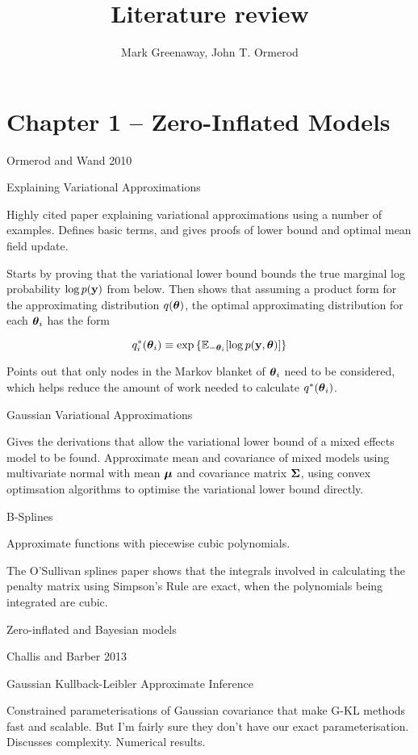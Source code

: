 \documentclass{amsart}[12pt]
\title{Literature review}
\author{Mark Greenaway, John T. Ormerod}
\begin{document}
\maketitle

\section{Chapter 1 -- Zero-Inflated Models}

Ormerod and Wand 2010

Explaining Variational Approximations

Highly cited paper explaining variational approximations using a number of examples.
Defines basic terms, and gives proofs of lower bound and optimal mean field update.

Starts by proving that the variational lower bound  bounds the true marginal log probability $\log p({\bf y})$
from below. Then shows that assuming a product form for the approximating distribution $q({\boldsymbol \theta})$, the
optimal approximating distribution for each ${\boldsymbol \theta}_i$ has the form

\[
	q_i^*({\boldsymbol \theta}_i) \equiv \exp{\{\mathbb{E}_{-{\boldsymbol\theta}_i}[\log p({\bf y}, {\boldsymbol\theta})]\}}
\]

Points out that only nodes in the Markov blanket of ${\boldsymbol \theta}_i$ need to be considered, which helps reduce the
amount of work needed to calculate $q^*({\boldsymbol \theta}_i)$.

Gaussian Variational Approximations

Gives the derivations that allow the variational lower bound of a mixed effects model to be found. Approximate
mean and covariance of mixed models using multivariate normal with mean ${\boldsymbol \mu}$ and covariance matrix
${\boldsymbol \Sigma}$, using convex optimsation algorithms to optimise the variational lower bound directly.

B-Splines

Approximate functions with piecewise cubic polynomials.

The O'Sullivan splines paper shows that the integrals involved in calculating the penalty matrix using Simpson's Rule are exact, when the polynomials being integrated are cubic.

Zero-inflated and Bayesian models

Challis and Barber 2013

Gaussian Kullback-Leibler Approximate Inference

Constrained parameterisations of Gaussian covariance that make G-KL methods fast and scalable. But I'm fairly
sure they don't have our exact parameterisation. Discusses complexity. Numerical results.
\end{document}

